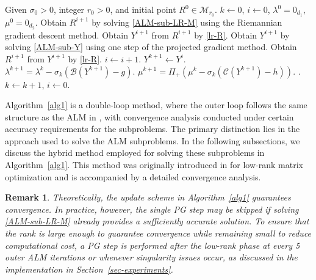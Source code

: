 \documentclass[11pt]{article}
\theoremstyle{plain}
\newtheorem{remark}{Remark}
\def\M{\mathcal{M}}
\def\B{\mathcal{B}}
\def\C{\mathcal{C}}
\begin{document}
\begin{algorithm}
\linespread{1.1}\selectfont
\caption{The RiNNAL+ method}
\label{alg1}
\begin{algorithmic}[1]
 Given $\sigma_0>0$, integer $r_0>0$, and initial point $R^0\in\M_{r_0}$.
\STATE $k\gets 0$, $i\gets 0$, $\lambda^0=0_{d_1}$, $\mu^0=0_{d_2}$.
        \STATE Obtain $R^{i+1}$ by solving \eqref{ALM-sub-LR-M} using the Riemannian gradient descent method.
        \STATE Obtain $Y^{i+1}$ from $R^{i+1}$ by \eqref{lr-R}.
        \STATE Obtain $Y^{i+1}$ by solving \eqref{ALM-sub-Y} using one step of the projected gradient method.
        \STATE Obtain $R^{i+1}$ from $Y^{i+1}$ by \eqref{lr-R}.
        \STATE $i\gets i+1$.
    \ENDWHILE
    \STATE $Y^{k+1}\gets Y^{i}$. %
    \STATE $\lambda^{k+1}=\lambda^{k}-\sigma_k (\B (Y^{k+1})-g)$.
    \STATE $\mu^{k+1}=\Pi_+(\mu^{k}-\sigma_k (\C (Y^{k+1})-h))$.
    .
    \STATE $k\gets k+1$,\;\; $i\gets 0$.
\ENDWHILE
\end{algorithmic}
\end{algorithm}

Algorithm~\ref{alg1} is a double-loop method, where the outer loop follows the same structure as the ALM in \cite{RiNNAL}, with convergence analysis conducted under certain accuracy requirements for the subproblems. The primary distinction lies in the approach used to solve the ALM subproblems. In the following subsections, we discuss the hybrid method employed for solving these subproblems in Algorithm~\ref{alg1}. This method was originally introduced in \cite{lee2022escaping} for low-rank matrix optimization and is accompanied by a detailed convergence analysis.

\begin{remark}
    Theoretically, the update scheme in Algorithm~\ref{alg1} guarantees convergence. In practice, however, the single PG step may be skipped if solving \eqref{ALM-sub-LR-M} already provides a sufficiently accurate solution. To ensure that the rank is large enough to guarantee convergence while remaining small to reduce computational cost, a PG step is performed after the low-rank phase at every 5 outer ALM iterations or whenever singularity issues occur, as discussed in the implementation in Section~\ref{sec-experiments}.
\end{remark}
\end{document}
